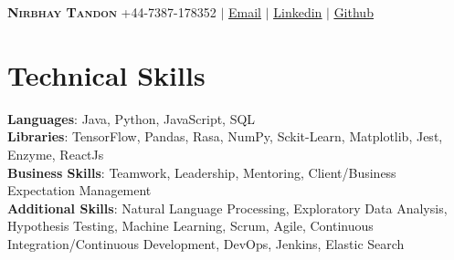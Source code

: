 \documentclass[letterpaper,11pt]{article}
\begin{document}

\begin{center}
    \textbf{\Huge \scshape Nirbhay Tandon} \hspace{135pt} \vspace{1pt} \small +44-7387-178352  $|$ \href{mailto:nirbaaytandon@gmail.com}{\underline{Email}} $|$ \href{https://www.linkedin.com/in/nirbaay}{\underline{Linkedin}} $|$
    \href{https://github.com/nirbaaytandon}{\underline{Github}}
\end{center}



\section{Technical Skills}
\begin{itemize}[leftmargin=0.1in, label={}]
	\small{\item{
			\textbf{Languages}{: Java, Python, JavaScript, SQL} \\
			\textbf{Libraries}{: TensorFlow, Pandas, Rasa, NumPy, Sckit-Learn, Matplotlib, Jest, Enzyme, ReactJs}\\
			\textbf{Business Skills}{: Teamwork, Leadership, Mentoring, Client/Business Expectation Management}\\
			\textbf{Additional Skills}{: Natural Language Processing, Exploratory Data Analysis, Hypothesis Testing, Machine Learning, Scrum, Agile, Continuous Integration/Continuous Development, DevOps, Jenkins, Elastic Search
} \\
	}}
\end{itemize}

\end{document}
